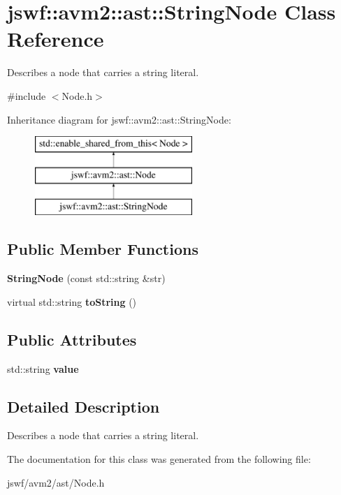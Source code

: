\hypertarget{classjswf_1_1avm2_1_1ast_1_1_string_node}{\section{jswf\+:\+:avm2\+:\+:ast\+:\+:String\+Node Class Reference}
\label{classjswf_1_1avm2_1_1ast_1_1_string_node}
}


Describes a node that carries a string literal.  




{\ttfamily \#include $<$Node.\+h$>$}

Inheritance diagram for jswf\+:\+:avm2\+:\+:ast\+:\+:String\+Node\+:\begin{figure}[H]
\begin{center}
\leavevmode
\includegraphics[height=3.000000cm]{classjswf_1_1avm2_1_1ast_1_1_string_node}
\end{center}
\end{figure}
\subsection*{Public Member Functions}
\begin{DoxyCompactItemize}
\item 
\hypertarget{classjswf_1_1avm2_1_1ast_1_1_string_node_a688425f6d5e10a44eca50e0f274a9df2}{{\bfseries String\+Node} (const std\+::string \&str)}\label{classjswf_1_1avm2_1_1ast_1_1_string_node_a688425f6d5e10a44eca50e0f274a9df2}

\item 
\hypertarget{classjswf_1_1avm2_1_1ast_1_1_string_node_a8a40cbb35ef50c6655ac71d915469af5}{virtual std\+::string {\bfseries to\+String} ()}\label{classjswf_1_1avm2_1_1ast_1_1_string_node_a8a40cbb35ef50c6655ac71d915469af5}

\end{DoxyCompactItemize}
\subsection*{Public Attributes}
\begin{DoxyCompactItemize}
\item 
\hypertarget{classjswf_1_1avm2_1_1ast_1_1_string_node_a01ed106d70ad68f14718ef667ebf00c3}{std\+::string {\bfseries value}}\label{classjswf_1_1avm2_1_1ast_1_1_string_node_a01ed106d70ad68f14718ef667ebf00c3}

\end{DoxyCompactItemize}


\subsection{Detailed Description}
Describes a node that carries a string literal. 

The documentation for this class was generated from the following file\+:\begin{DoxyCompactItemize}
\item 
jswf/avm2/ast/Node.\+h\end{DoxyCompactItemize}
